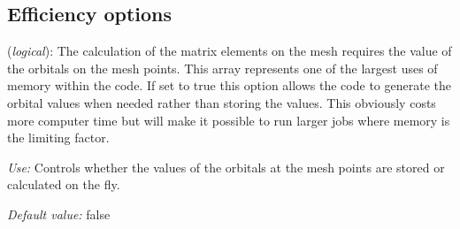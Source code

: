 \documentclass[11pt]{article}
\begin{document}
\subsection{Efficiency options}

\begin{description}
\itemsep 10pt
\parsep 0pt

\item[{\bf DirectPhi}] ({\it logical}):
The calculation of the matrix elements on the mesh requires the
value of the orbitals on the mesh points. This array represents one of
the largest uses of memory within the code. If set to true this option
allows the code to generate the orbital values when needed rather than
storing the values. This obviously costs more computer time but will
make it possible to run larger jobs where memory is the limiting factor.

{\it Use:} Controls whether the values of the orbitals at the mesh points
  are stored or calculated on the fly.

{\it Default value:}  false

\end{description}
\end{document}

